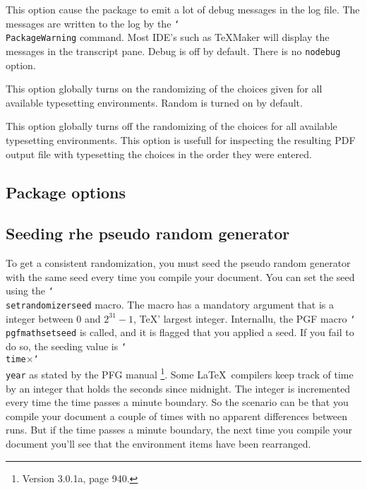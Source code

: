 \documentclass[12pt,a4paper]{exam}
\providecommand{\texorpdfstring}[2]{#1}
\newcommand{\bs}{\texorpdfstring{\char`\\}{}}
\begin{document}
\begin{description}[labelindent=2ex]
\item[\texttt{debug}] This option cause the package to emit a lot of debug messages
in the log file. The messages are written to the log by the \texttt{\bs{PackageWarning}}
command. Most IDE's such as TeXMaker will display the messages in the transcript pane.
Debug is off by default. There is no \texttt{nodebug} option.

\item[random] This option globally turns on the randomizing of the choices given for all
available typesetting environments. Random is turned on by default.

\item[norandom] This option globally turns off the randomizing of the choices for all
available typesetting environments. This option is usefull for inspecting the resulting
PDF output file with typesetting the choices in the order they were entered.

\end{description}

\subsection{Package options}

\subsection{Seeding rhe pseudo random generator}
\label{sec:seeding}
To get a consistent randomization, you must seed the pseudo random generator
with the same seed every time you compile your document. You can set the
seed using the \texttt{\bs setrandomizerseed} macro. The macro has a mandatory
argument that is a integer between 0 and $2^{31}-1$, \TeX' largest integer.
Internallu, the PGF macro \texttt{\bs pgfmathsetseed} is called, and it is
flagged that you applied a seed. If you fail to do so, the seeding value is
\texttt{\bs time}$\times$\texttt{\bs year} as stated by the PFG manual%
\footnote{Version 3.0.1a, page 940.}. Some \LaTeX\ compilers keep track of
time by an integer that holds the seconds since midnight. The integer is
incremented every time the time passes a minute boundary. So the scenario
can be that you compile your document a couple of times with no apparent
differences between runs. But if the time passes a minute boundary, the
next time you compile your document you'll see that the environment items
have been rearranged.
\end{document}
